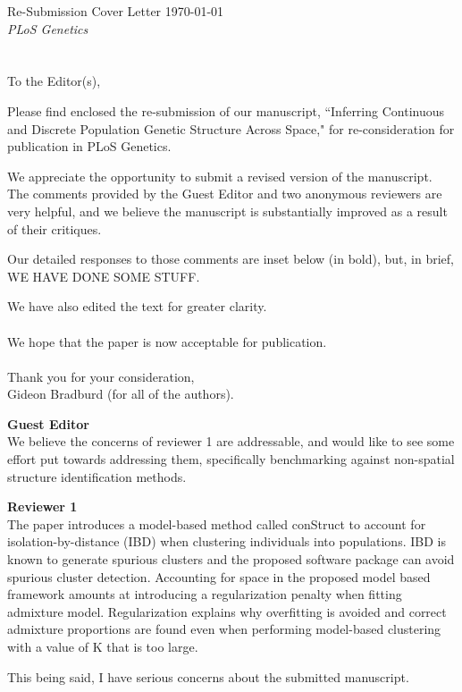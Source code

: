 \documentclass[11pt]{letter}
\begin{document}
Re-Submission Cover Letter \hfill	\today\\
\emph{PLoS Genetics}
\\\\\\
To the Editor(s),

Please find enclosed the re-submission of our manuscript, 
``Inferring Continuous and Discrete Population Genetic Structure Across Space,"
for re-consideration for publication in PLoS Genetics.

We appreciate the opportunity to submit a revised version of the manuscript.  
The comments provided by the Guest Editor 
and two anonymous reviewers are very helpful, 
and we believe the manuscript is substantially improved as a result 
of their critiques.

Our detailed responses to those comments are inset below (in bold), 
but, in brief, WE HAVE DONE SOME STUFF.

We have also edited the text for 
greater clarity.\\\\
%
We hope that the paper is now acceptable for publication.\\\\
%
Thank you for your consideration,\\
Gideon Bradburd (for all of the authors).

\newpage

\textbf{Guest Editor}\\
We believe the concerns of reviewer 1 are addressable, and would like to see some effort put towards addressing them, specifically benchmarking against non-spatial structure identification methods.

\textbf{Reviewer 1}\\
The paper introduces a model-based method called conStruct to account for isolation-by-distance (IBD) when clustering individuals into populations. IBD is known to generate spurious clusters and the proposed software package can avoid spurious cluster detection. Accounting for space in the proposed model based framework amounts at introducing a regularization penalty when fitting admixture model. Regularization explains why overfitting is avoided and correct admixture proportions are found even when performing model-based clustering with a value of K that is too large.

This being said, I have serious concerns about the submitted manuscript. 
\end{document}
